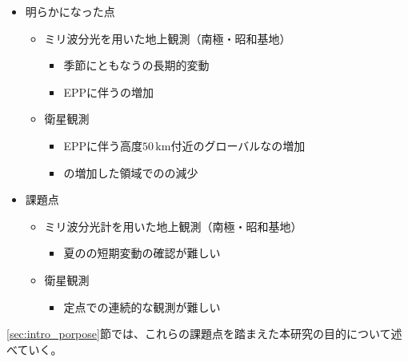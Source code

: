 \begin{itemize}
    \item 明らかになった点
    \begin{itemize}
        \item ミリ波分光を用いた地上観測（南極・昭和基地）
        \begin{itemize}
            \item 季節にともなうの長期的変動
            \item EPPに伴うの増加
        \end{itemize}
        \item 衛星観測
        \begin{itemize}
            \item EPPに伴う高度$50\, \mathrm{km}$付近のグローバルなの増加
            \item {}の増加した領域でのの減少
        \end{itemize}
    \end{itemize}
    \item 課題点
    \begin{itemize}
        \item ミリ波分光計を用いた地上観測（南極・昭和基地）
        \begin{itemize}
            \item 夏のの短期変動の確認が難しい
        \end{itemize}
        \item 衛星観測
        \begin{itemize}
            \item 定点での連続的な観測が難しい
        \end{itemize}
    \end{itemize}
\end{itemize}
\ref{sec:intro_porpose}節では、これらの課題点を踏まえた本研究の目的について述べていく。


